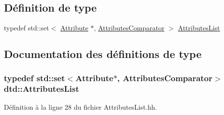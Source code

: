 \subsection*{Définition de type}
\begin{DoxyCompactItemize}
\item 
typedef std::set$<$ \hyperlink{classdtd_1_1_attribute}{Attribute} $\ast$, \hyperlink{structdtd_1_1_attributes_comparator}{AttributesComparator} $>$ \hyperlink{namespacedtd_a8d5d29abb5de0468925f321597f57f4b}{AttributesList}
\end{DoxyCompactItemize}


\subsection{Documentation des définitions de type}
\hypertarget{namespacedtd_a8d5d29abb5de0468925f321597f57f4b}{
\subsubsection[{AttributesList}]{\setlength{\rightskip}{0pt plus 5cm}typedef std::set$<${\bf Attribute}$\ast$, {\bf AttributesComparator}$>$ {\bf dtd::AttributesList}}}
\label{namespacedtd_a8d5d29abb5de0468925f321597f57f4b}


Définition à la ligne 28 du fichier AttributesList.hh.

